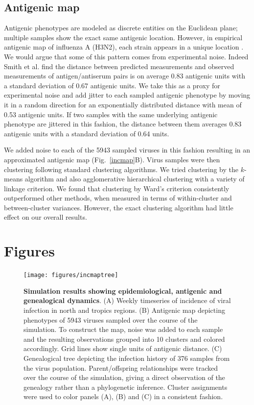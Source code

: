 \documentclass[11pt,oneside,letterpaper]{article}
\begin{document}
\subsection*{Antigenic map}

Antigenic phenotypes are modeled as discrete entities on the Euclidean plane; multiple samples show the exact same antigenic location.  However, in empirical antigenic map of influenza A (H3N2), each strain appears in a unique location \cite{Smith04}.  We would argue that some of this pattern comes from experimental noise.  Indeed Smith et al. \cite{Smith04} find the distance between predicted measurements and observed measurements of antigen/antiserum pairs is on average 0.83 antigenic units with a standard deviation of 0.67 antigenic units.  We take this as a proxy for experimental noise and add jitter to each sampled antigenic phenotype by moving it in a random direction for an exponentially distributed distance with mean of 0.53 antigenic units.  If two samples with the same underlying antigenic phenotype are jittered in this fashion, the distance between them averages 0.83 antigenic units with a standard deviation of 0.64 units.

We added noise to each of the 5943 sampled viruses in this fashion resulting in an approximated antigenic map (Fig.~\ref{incmap}B).  Virus samples were then clustering following standard clustering algorithms.  We tried clustering by the $k$-means algorithm and also agglomerative hierarchical clustering with a variety of linkage criterion.  We found that clustering by Ward's criterion consistently outperformed other methods, when measured in terms of within-cluster and between-cluster variances.  However, the exact clustering algorithm had little effect on our overall results.



\pagebreak

\section*{Figures}

\begin{figure}[H]
	\centering
	\texttt{[image: figures/incmaptree]}
	\caption{\textbf{Simulation results showing epidemiological, antigenic and genealogical dynamics}. (A) Weekly timeseries of incidence of viral infection in north and tropics regions. (B) Antigenic map depicting phenotypes of 5943 viruses sampled over the course of the simulation.  To construct the map, noise was added to each sample and the resulting observations grouped into 10 clusters and colored accordingly.  Grid lines show single units of antigenic distance. (C) Genealogical tree depicting the infection history of 376 samples from the virus population.  Parent/offspring relationships were tracked over the course of the simulation, giving a direct observation of the genealogy rather than a phylogenetic inference. Cluster assignments were used to color panels (A), (B) and (C) in a consistent fashion.}
	\label{incmaptree}
\end{figure}
\end{document}
